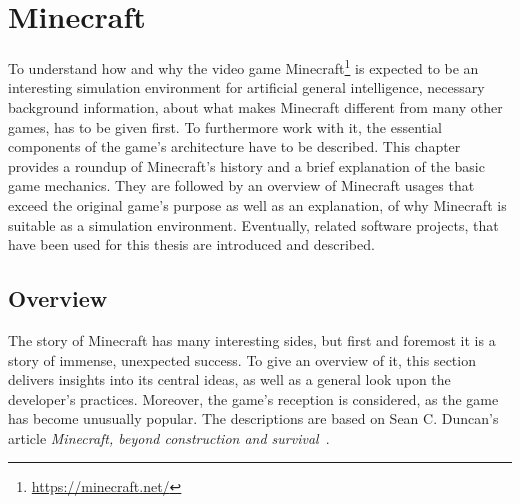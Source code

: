 \chapter{Minecraft}
\label{chap:3}
To understand how and why the video game Minecraft\footnote{\url{https://minecraft.net/}} is expected to be an interesting simulation environment for artificial general intelligence, necessary background information, about what makes Minecraft different from many other games, has to be given first. To furthermore work with it, the essential components of the game's architecture have to be described. This chapter provides a roundup of Minecraft's history and a brief explanation of the basic game mechanics. They are followed by an overview of Minecraft usages that exceed the original game's purpose as well as an explanation, of why Minecraft is suitable as a simulation environment. Eventually, related software projects, that have been used for this thesis are introduced and described.

    \section{Overview}
The story of Minecraft has many interesting sides, but first and foremost it is a story of immense, unexpected success. To give an overview of it, this section delivers insights into its central ideas, as well as a general look upon the developer's practices. Moreover, the game's reception is considered, as the game has become unusually popular. The descriptions are based on Sean C. Duncan's article \emph{Minecraft, beyond construction and survival}~\cite{Duncan:2011:MBC:2207096.2207097}.
    
